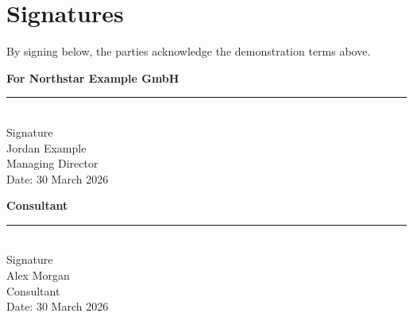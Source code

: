 \documentclass[11pt,a4paper]{article}
\begin{document}
\vfill
\section*{Signatures}
By signing below, the parties acknowledge the demonstration terms above.

\vspace{2em}
\noindent
\begin{minipage}[t]{0.46\textwidth}
    \textbf{For Northstar Example GmbH}\\[3.2em]
    \rule{0.96\linewidth}{0.45pt}\\[-1pt]
    Signature\\[0.8em]
    Jordan Example\\
    Managing Director\\[0.8em]
    Date: 30 March 2026
\end{minipage}
\hfill
\begin{minipage}[t]{0.46\textwidth}
    \textbf{Consultant}\\[3.2em]
    \rule{0.96\linewidth}{0.45pt}\\[-1pt]
    Signature\\[0.8em]
    Alex Morgan\\
    Consultant\\[0.8em]
    Date: 30 March 2026
\end{minipage}
\end{document}
